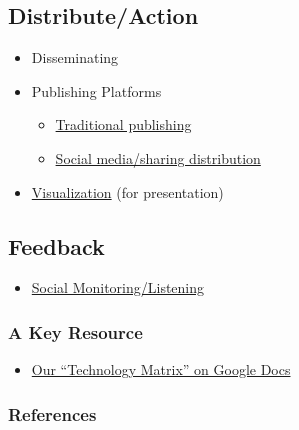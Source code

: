 \subsection{Distribute/Action}

\begin{itemize}
\item
  Disseminating
\end{itemize}

\begin{itemize}
\item
  Publishing Platforms

  \begin{itemize}
  \item
    \href{http://peeragogy.org/traditional-publishing/}{Traditional
    publishing}
  \item
    \href{http://peeragogy.org/social-media-sharingdistribution/}{Social
    media/sharing distribution}
  \end{itemize}
\item
  \href{http://peeragogy.org/visualization/}{Visualization} (for
  presentation)
\end{itemize}

\subsection{Feedback}

\begin{itemize}
\item
  \href{http://peeragogy.org/social-listening/}{Social
  Monitoring/Listening}
\end{itemize}

\subsubsection{A Key Resource}

\begin{itemize}
\item
  \href{-https://docs.google.com/spreadsheet/ccc?key=0ApZ8\_aXL9go8dEUxeThxblhQWmVPbHdHdWpaLWxOWGc\#gid=0}{Our
  ``Technology Matrix'' on Google Docs}
\end{itemize}

\subsubsection{References}

